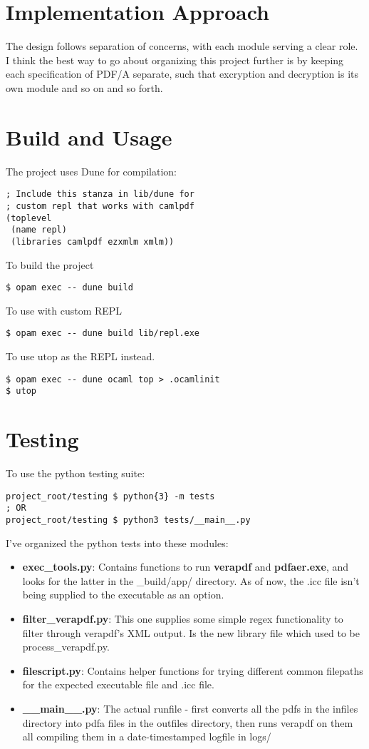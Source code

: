 \documentclass[11pt]{article}
\begin{document}
\section*{Implementation Approach}
The design follows separation of concerns, with each module serving a clear role. 
I think the best way to go about organizing this project further is by keeping each specification of PDF/A separate,
such that excryption and decryption is its own module and so on and so forth. 

\section*{Build and Usage}
The project uses Dune for compilation:
\begin{verbatim}
; Include this stanza in lib/dune for 
; custom repl that works with camlpdf
(toplevel
 (name repl)
 (libraries camlpdf ezxmlm xmlm))
\end{verbatim}
To build the project 
\begin{verbatim}
$ opam exec -- dune build
\end{verbatim}
To use with custom REPL
\begin{verbatim}
$ opam exec -- dune build lib/repl.exe
\end{verbatim}
To use utop as the REPL instead.
\begin{verbatim}
$ opam exec -- dune ocaml top > .ocamlinit
$ utop
\end{verbatim}

\section*{Testing}
To use the python testing suite:
\begin{verbatim}
project_root/testing $ python{3} -m tests
; OR
project_root/testing $ python3 tests/__main__.py
\end{verbatim}

I've organized the python tests into these modules:
\begin{itemize}
  \item \textbf{exec\_tools.py}: Contains functions to run \textbf{verapdf} and \textbf{pdfaer.exe}, and looks for the latter in the \_build/app/ directory. As of now, the .icc file isn't being supplied to the executable as an option.
  \item \textbf{filter\_verapdf.py}: This one supplies some simple regex functionality to filter through verapdf's XML output. Is the new library file which used to be process\_verapdf.py. 
  \item \textbf{filescript.py}: Contains helper functions for trying different common filepaths for the expected executable file and .icc file.
  \item \textbf{\_\_main\_\_.py}: The actual runfile - first converts all the pdfs in the infiles directory into pdfa files in the outfiles directory, then runs verapdf on them all compiling them in a date-timestamped logfile in logs/
\end{itemize}
\end{document}
